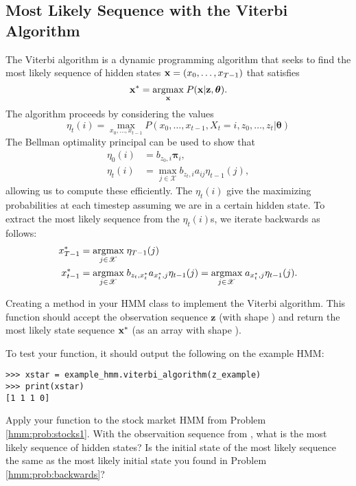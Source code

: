 \subsection*{Most Likely Sequence with the Viterbi Algorithm}

The Viterbi algorithm is a dynamic programming algorithm that seeks to find the most likely sequence of hidden states $\mathbf{x}=(x_0,\ldots,x_{T-1})$ that satisfies
\[
\mathbf{x}^*=\underset{\mathbf{x}}{\mbox{argmax}} \;P(\mathbf{x}|\mathbf{z},\boldsymbol\theta).
\]
The algorithm proceeds by considering the values
\[
\eta_t(i)
=
\max_{x_0,\ldots, x_{t-1}}
P(x_0,\ldots,x_{t-1}, X_t=i, z_0,\ldots,z_t|\boldsymbol\theta)
\]
The Bellman optimality principal can be used to show that
\begin{align*}
\eta_0(i)&= b_{z_0,i}\boldsymbol\pi_i, \\
\eta_t(i)&=\max_{j\in\mathscr{X}}  b_{z_t,i}a_{ij}\eta_{t-1}(j),
\end{align*}
allowing us to compute these efficiently.
The $\eta_t(i)$ give the maximizing probabilities at each timestep assuming we are in a certain hidden state.
To extract the most likely sequence from the $\eta_t(i)$s, we iterate backwards as follows:
\begin{align*}
x^*_{T-1}&=\underset{j\in\mathscr{X}}{\mbox{argmax}}\;\eta_{T-1}(j) \\
x^*_{t-1} &=
\underset{j\in\mathscr{X}}{\mbox{argmax}}\;
b_{z_t,x^*_t}a_{x^*_t,j}\eta_{t-1}(j)
=
\underset{j\in\mathscr{X}}{\mbox{argmax}}\;
a_{x^*_t,j}\eta_{t-1}(j).
\end{align*}

\begin{problem}
Creating a method  in your HMM class to implement the Viterbi algorithm.
This function should accept the observation sequence $\mathbf{z}$ (with shape ) and return the most likely state sequence $\mathbf{x}^*$ (as an array with shape ).

To test your function, it should output the following on the example HMM:
\begin{lstlisting}
>>> xstar = example_hmm.viterbi_algorithm(z_example)
>>> print(xstar)
[1 1 1 0]
\end{lstlisting}
Apply your function to the stock market HMM from Problem \ref{hmm:prob:stocks1}.
With the observaition sequence from , what is the most likely sequence of hidden states?
Is the initial state of the most likely sequence the same as the most likely initial state you found in Problem \ref{hmm:prob:backwards}?
\end{problem}

